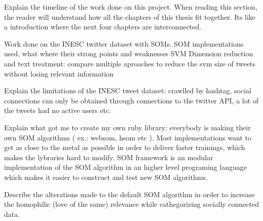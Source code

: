 Explain the timeline of the work done on this project. When reading this section, the reader will understand how all the chapters of this thesis fit together. 
Its like a introduction where the next four chapters are interconnected.

Work done on the INESC twitter dataset with SOMs.
SOM implementations used, what where their strong points and weaknesses
SVM Dimension reduction and text treatment: compare multiple aproaches to reduce the svm size of tweets without losing relevant information

Explain the limitations of the INESC tweet dataset: crawlled by hashtag, social connections can only be obtained through connections to the twitter API, a lot of the tweets had no active users etc. 

Explain what got me to create my own ruby library: everybody is making their own SOM algorithms ( ex.: websom, hsom etc ). Most implementations want to get as close to the metal as possible in order to deliver faster trainings, which makes the lybraries hard to modify. SOM framework is an modular implementation of the SOM algorithm in an higher level programing language which makes it easier to construct and test new SOM algorithms.

Describe the alterations made to the default SOM algorithm in order to increase the homophilic (love of the same) relevance while cathegorizing socially connected data.

%

